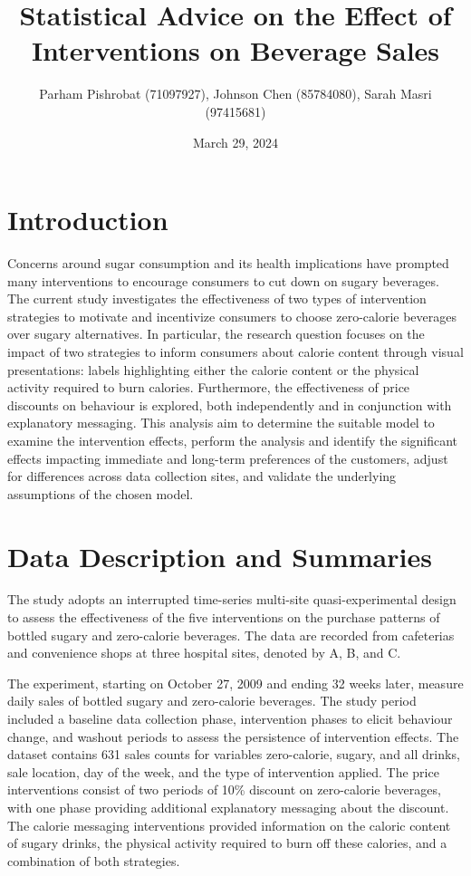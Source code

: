 \documentclass[
]{article}
\title{Statistical Advice on the Effect of Interventions on Beverage Sales}
\author{Parham Pishrobat (71097927), Johnson Chen (85784080), Sarah Masri (97415681)}
\date{March 29, 2024}
\begin{document}
\maketitle

{
\setcounter{tocdepth}{2}
\tableofcontents
}
\pagebreak

\hypertarget{introduction}{%
\section{Introduction}\label{introduction}}

Concerns around sugar consumption and its health implications have prompted many interventions to encourage consumers to cut down on sugary beverages. The current study investigates the effectiveness of two types of intervention strategies to motivate and incentivize consumers to choose zero-calorie beverages over sugary alternatives. In particular, the research question focuses on the impact of two strategies to inform consumers about calorie content through visual presentations: labels highlighting either the calorie content or the physical activity required to burn calories. Furthermore, the effectiveness of price discounts on behaviour is explored, both independently and in conjunction with explanatory messaging. This analysis aim to determine the suitable model to examine the intervention effects, perform the analysis and identify the significant effects impacting immediate and long-term preferences of the customers, adjust for differences across data collection sites, and validate the underlying assumptions of the chosen model.

\hypertarget{data-description-and-summaries}{%
\section{Data Description and Summaries}\label{data-description-and-summaries}}

The study adopts an interrupted time-series multi-site quasi-experimental design to assess the effectiveness of the five interventions on the purchase patterns of bottled sugary and zero-calorie beverages. The data are recorded from cafeterias and convenience shops at three hospital sites, denoted by A, B, and C.

The experiment, starting on October 27, 2009 and ending 32 weeks later, measure daily sales of bottled sugary and zero-calorie beverages. The study period included a baseline data collection phase, intervention phases to elicit behaviour change, and washout periods to assess the persistence of intervention effects. The dataset contains 631 sales counts for variables zero-calorie, sugary, and all drinks, sale location, day of the week, and the type of intervention applied. The price interventions consist of two periods of 10\% discount on zero-calorie beverages, with one phase providing additional explanatory messaging about the discount. The calorie messaging interventions provided information on the caloric content of sugary drinks, the physical activity required to burn off these calories, and a combination of both strategies.
\end{document}
